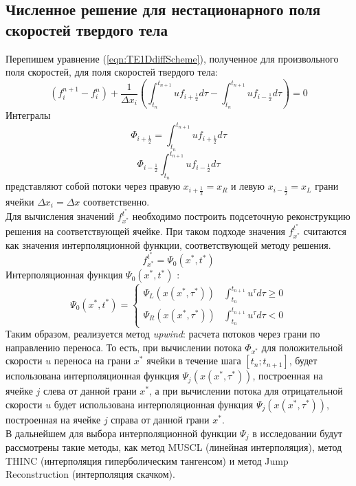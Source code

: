 \documentclass[10pt,a4paper]{article}
\begin{document}
\subsection{Численное решение для нестационарного поля скоростей твердого тела}
Перепишем уравнение (\ref{eqn:TE1DdiffScheme}), полученное для произвольного поля скоростей, для поля скоростей твердого тела:
\[
(f_i^{n+1}-f_i^n)
+
\frac{1}{\Delta x_i} (
\int_{t_n}^{t_{n+1}}
{u}f_{i+\frac{1}{2}}d\tau
-
\int_{t_n}^{t_{n+1}}
{u}f_{i-\frac{1}{2}}d\tau
)=0
\]
Интегралы
\begin{equation}
\label{eqn:FlowR}
\Phi_{i+\frac{1}{2}}=\int_{t_n}^{t_{n+1}}
{u}f_{i+\frac{1}{2}}d\tau
\end{equation}
\begin{equation}
\label{eqn:FlowL}
\Phi_{i-\frac{1}{2}}\int_{t_n}^{t_{n+1}}
{u}f_{i-\frac{1}{2}}d\tau
\end{equation}
представляют собой потоки через правую $x_{i+\frac{1}{2}}=x_R$ и левую $x_{i-\frac{1}{2}}=x_L$ грани ячейки $\Delta x_i = \Delta x$ соответственно.\\

Для вычисления значений $f_{x^*}^{t^*}$ необходимо построить подсеточную реконструкцию решения на соответствующей ячейке. При таком подходе значения $f_{x^*}^{t^*}$ считаются как значения интерполяционной функции, соответствующей методу решения.
\[
f_{x^*}^{t^*} = \Psi_0(x^*, t^*)
\]
Интерполяционная функция $\Psi_0(x^*, t^*)$ :
\begin{equation}
\label{eqn:PsyIntrpolationFunc}
\Psi_0(x^*, t^*) = \begin{cases}
\Psi_{L}(x(x^*,\tau^*))
& \int_{t_n}^{t_{n+1}} u^{\tau}d\tau\geq0
\\
\Psi_{R}(x(x^*,\tau^*))
& \int_{t_n}^{t_{n+1}} u^{\tau}d\tau < 0
\end{cases}
\end{equation}
Таким образом, реализуется метод \textit{upwind}: расчета потоков через грани по направлению переноса.
То есть, при вычислении потока $\Phi_{x^*}$ для положительной скорости $u$ переноса на грани $x^*$ ячейки в течение шага $[t_n; t_{n+1}]$, будет использована интерполяционная функция $\Psi_{j}(x(x^*,\tau^*))$, построенная на ячейке $j$ слева от данной грани $x^*$, а при вычислении потока для отрицательной скорости $u$ будет использована интерполяционная функция $\Psi_{j}(x(x^*,\tau^*))$, построенная на ячейке $j$ справа от данной грани $x^*$.\\

В дальнейшем для выбора интерполяционной функции $\Psi_{j}$ в исследовании будут рассмотрены такие методы, как метод MUSCL (линейная интерполяция), метод THINC (интерполяция гиперболическим тангенсом) и метод Jump Reconstruction (интерполяция скачком).\\
\end{document}

